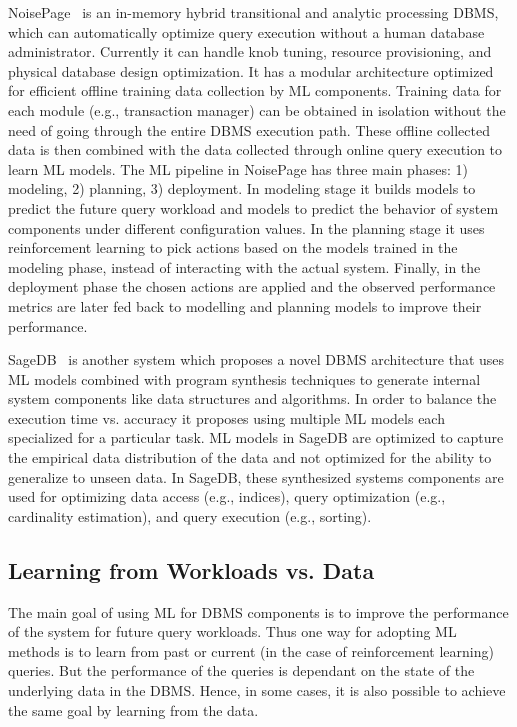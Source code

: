 NoisePage~\cite{noisepage} is an in-memory  hybrid transitional and analytic processing DBMS, which can automatically optimize query execution without a human database administrator.
Currently it can handle knob tuning, resource provisioning, and physical database design optimization.
It has a modular architecture optimized for efficient offline training data collection by ML components.
Training data for each module (e.g., transaction manager) can be obtained in isolation without the need of going through the entire DBMS execution path.
These offline collected data is then combined with the data collected through online query execution to learn ML models.
The ML pipeline in NoisePage has three main phases: 1) modeling, 2) planning, 3) deployment.
In modeling stage it builds models to predict the future query workload and models to predict the behavior of system components under different configuration values.
In the planning stage it uses reinforcement learning to pick actions based on the models trained in the modeling phase, instead of interacting with the actual system.
Finally, in the deployment phase the chosen actions are applied and the observed performance metrics are later fed back to modelling and planning models to improve their performance.

SageDB~\cite{sagedb} is another system which proposes a novel DBMS architecture that uses ML models combined with program synthesis techniques to generate internal system components like data structures and algorithms.
In order to balance the execution time vs. accuracy it proposes using multiple ML models each specialized for a particular task.
ML models in SageDB are optimized to capture the empirical data distribution of the data and not optimized for the ability to generalize to unseen data.
In SageDB, these synthesized systems components are  used for optimizing data access (e.g., indices), query optimization (e.g., cardinality estimation), and query execution (e.g., sorting).


\subsection{Learning from Workloads vs. Data} 
The main goal of using ML for DBMS components is to improve the performance of the system for future query workloads.
Thus one way for adopting ML methods is to learn from past or current (in the case of reinforcement learning) queries.
But the performance of the queries is dependant on the state of the underlying data in the DBMS.
Hence, in some cases, it is also possible to achieve the same goal by learning from the data.

